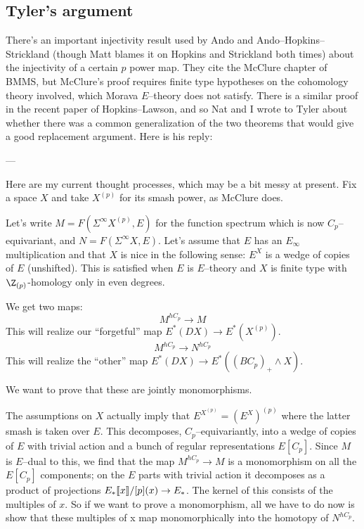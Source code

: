 \subsection*{Tyler's argument}

There's an important injectivity result used by Ando and Ando--Hopkins--Strickland (though Matt blames it on Hopkins and Strickland both times) about the injectivity of a certain $p${\th} power map.  They cite the McClure chapter of BMMS, but McClure's proof requires finite type hypotheses on the cohomology theory involved, which Morava $E$--theory does not satisfy.  There is a similar proof in the recent paper of Hopkins--Lawson, and so Nat and I wrote to Tyler about whether there was a common generalization of the two theorems that would give a good replacement argument.  Here is his reply:

---

Here are my current thought processes, which may be a bit messy at present. Fix a space $X$ and take $X^{(p)}$ for its smash power, as McClure does.

Let's write $M = F(\Sigma^\infty X^{(p)}, E)$ for the function spectrum which is now $C_p$--equivariant, and $N = F(\Sigma^\infty X,E)$. Let's assume that $E$ has an $E_\infty$ multiplication and that $X$ is nice in the following sense: $E^X$ is a wedge of copies of $E$ (unshifted). This is satisfied when $E$ is $E$--theory and $X$ is finite type with $\Z_{(p)}$-homology only in even degrees.

We get two maps:
\[M^{hC_p} \to M\]
This will realize our ``forgetful'' map $E^*(D X) \to E^*(X^{(p)})$.
\[M^{hC_p} \to N^{hC_p}\]
This will realize the ``other'' map $E^*(D X) \to E^*((BC_p)_+ \wedge X)$.

We want to prove that these are jointly monomorphisms.

The assumptions on $X$ actually imply that $E^{X^{(p)}} = (E^X)^{(p)}$ where the latter smash is taken over $E$. This decomposes, $C_p$--equivariantly, into a wedge of copies of $E$ with trivial action and a bunch of regular representations $E[C_p]$. Since $M$ is $E$--dual to this, we find that the map $M^{hC_p} \to M$ is a monomorphism on all the $E[C_p]$ components; on the $E$ parts with trivial action it decomposes as a product of projections $E_*\llbracket{x}\rrbracket / [p](x) \to E_*$. The kernel of this consists of the multiples of $x$. So if we want to prove a monomorphism, all we have to do now is show that these multiples of x map monomorphically into the homotopy of $N^{hC_p}$.

